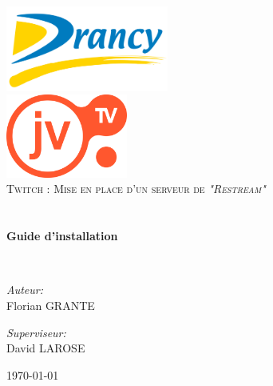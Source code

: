 \begin{titlepage}
\begin{center}

\includegraphics[width=0.4\textwidth]{./images/logo}~\\[1cm]
\includegraphics[width=0.3\textwidth]{./images/jvtv}~\\[1cm]

\textsc{\LARGE Twitch : Mise en place d'un serveur de \textit{"Restream"}}\\[1.5cm]

\textsc{\Large }\\[0.5cm]

\HRule \\[0.4cm]

{\huge \bfseries Guide d'installation\\[0.4cm] }

\HRule \\[1.5cm]

\begin{minipage}{0.4\textwidth}
\begin{flushleft} \large
\emph{Auteur:}\\
Florian \textsc{GRANTE}\\
\end{flushleft}
\end{minipage}
\begin{minipage}{0.4\textwidth}
\begin{flushright} \large
\emph{Superviseur:} \\
David \textsc{LAROSE}
\end{flushright}
\end{minipage}

\vfill

{\large \today}

\end{center}
\end{titlepage}